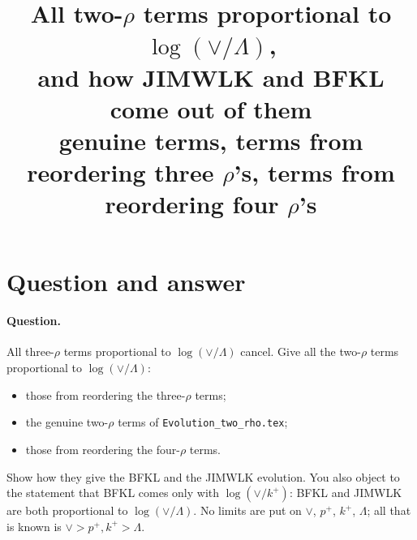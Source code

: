 \documentclass[10pt]{article}
\title{All two-$\rho$ terms proportional to $\log(\vee/\Lambda)$,\\ and how JIMWLK and BFKL come out of them\\[4pt]
\large genuine terms, terms from reordering three $\rho$'s, terms from reordering four $\rho$'s}
\date{}
\numberwithin{equation}{section}
\begin{document}
\maketitle
\tableofcontents

\section{Question and answer}\label{sec:answer}

\paragraph{Question.} All three-$\rho$ terms proportional to $\log(\vee/\Lambda)$ cancel. Give all the two-$\rho$ terms proportional to $\log(\vee/\Lambda)$:
\begin{itemize}
\item those from reordering the three-$\rho$ terms;
\item the genuine two-$\rho$ terms of \texttt{Evolution\_two\_rho.tex};
\item those from reordering the four-$\rho$ terms.
\end{itemize}
Show how they give the BFKL and the JIMWLK evolution. You also object to the statement that BFKL comes only with $\log(\vee/k^+)$: BFKL and JIMWLK are both proportional to $\log(\vee/\Lambda)$. No limits are put on $\vee$, $p^+$, $k^+$, $\Lambda$; all that is known is $\vee>p^+,k^+>\Lambda$.
\end{document}
